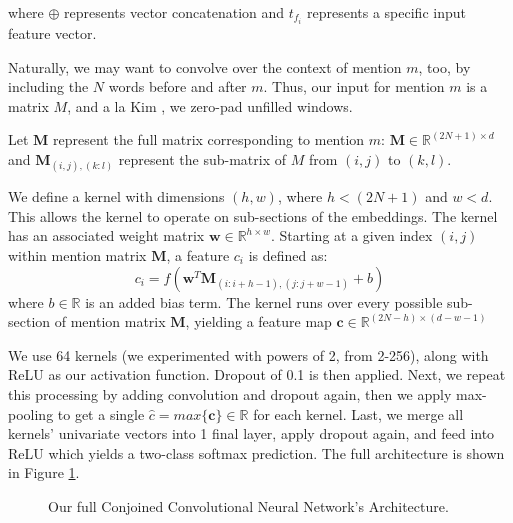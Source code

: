 \documentclass[11pt,a4paper]{article}
\begin{document}
where $\oplus$ represents vector concatenation and $t_{f_{i}}$ represents a specific input feature vector.

Naturally, we may want to convolve over the context of mention $m$, too, by including the $N$ words before and after $m$.  Thus, our input for mention $m$ is a matrix $M$, and a la Kim , we zero-pad unfilled windows.

\vspace{3mm}

Let $\textbf{M}$ represent the full matrix corresponding to mention $m$: $\textbf{M} \in \mathbb{R}^{(2N+1) \times d}$ and $\textbf{M}_{(i,j),(k:l)}$ represent the sub-matrix of $M$ from $(i,j)$ to $(k,l)$.

\vspace{3mm}

We define a kernel with dimensions $(h,w)$, where $h < (2N+1)$ and $w < d$.  This allows the kernel to operate on sub-sections of the embeddings.  The kernel has an associated weight matrix $\textbf{w} \in \mathbb{R}^{h \times w}$.  Starting at a given index $(i,j)$ within mention matrix $\textbf{M}$, a feature $c_{i}$ is defined as:
\begin{equation}
c_{i} = f(\textbf{w}^{T}\textbf{M}_{(i:i+h-1),(j:j+w-1)} + b)
\end{equation}
where $b \in \mathbb{R}$ is an added bias term.  The kernel runs over every possible sub-section of mention matrix $\textbf{M}$, yielding a feature map $\textbf{c} \in \mathbb{R}^{(2N-h) \times (d-w-1)}$

\vspace{3mm}

We use 64 kernels (we experimented with powers of 2, from 2-256), along with ReLU as our activation function.  Dropout of 0.1 is then applied.  Next, we repeat this processing by adding convolution and dropout again, then we apply max-pooling to get a single $\hat{c} = max\{\textbf{c\}} \in \mathbb{R}$ for each kernel. Last, we merge all kernels' univariate vectors into 1 final layer, apply dropout again, and feed into ReLU which yields a two-class softmax prediction.  The full architecture is shown in Figure \ref{fig:ccnn}.

\begin{figure}
\caption{Our full Conjoined Convolutional Neural Network's Architecture.}
\label{fig:ccnn}
\end{figure}
\end{document}
